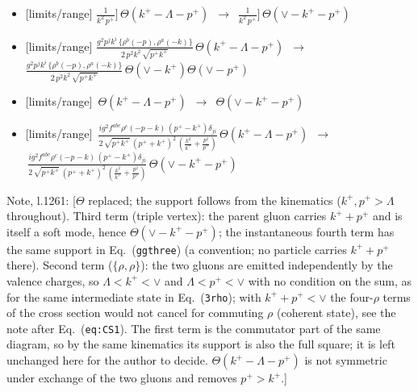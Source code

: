 \documentclass[10pt]{article}
\newenvironment{notebox}{\def\FrameCommand{{\color{notebar}\vrule width 1.5pt}\hspace{6pt}}\MakeFramed{\advance\hsize-\width\FrameRestore}\small}{\endMakeFramed}
\begin{document}
\begin{itemize}[leftmargin=2.2em,itemsep=1pt,topsep=2pt]
\item[\textbf{l.1260}] \textsf{\small [limits/range]} $\displaystyle \frac{1}{k^{2}\,p^{+}}]\,\Theta(k^{+}-\Lambda-p^{+})$\ $\longrightarrow$\ $\displaystyle \frac{1}{k^{2}\,p^{+}}]\,\Theta(\vee-k^{+}-p^{+})$
\item[\textbf{l.1260}] \textsf{\small [limits/range]} $\displaystyle \frac{g^{2}p^{j}k^{i}\,\{\rho^{b}(-p),\rho^{a}(-k)\}}{2\,p^{2}k^{2}\, \sqrt{p^{+}k^{+}}}\,\Theta(k^{+}-\Lambda-p^{+})$\ $\longrightarrow$\ $\displaystyle \frac{g^{2}p^{j}k^{i}\,\{\rho^{b}(-p),\rho^{a}(-k)\}}{2\,p^{2}k^{2}\, \sqrt{p^{+}k^{+}}}\,\Theta(\vee-k^{+})\Theta(\vee-p^{+})$
\item[\textbf{l.1260}] \textsf{\small [limits/range]} $\displaystyle \,\Theta(k^{+}-\Lambda-p^{+})$\ $\longrightarrow$\ $\displaystyle \Theta(\vee-k^{+}-p^{+})$
\item[\textbf{l.1260}] \textsf{\small [limits/range]} $\displaystyle \,\frac{ig^{2}f^{abc}\rho^{c}(-p-k)\,(p^{+}-k^{+})\delta_{ji}}{2\,\sqrt{p^{+}k^{+}}\,(p^{+}+k^{+})^{2}\,(\frac{k^{2}}{k^{+}}+\frac{p^{2}}{p^{+}})}\,\Theta(k^{+}-\Lambda-p^{+})$\ $\longrightarrow$\ $\displaystyle \,\frac{ig^{2}f^{abc}\rho^{c}(-p-k)\,(p^{+}-k^{+})\delta_{ji}}{2\,\sqrt{p^{+}k^{+}}\,(p^{+}+k^{+})^{2}\,(\frac{k^{2}}{k^{+}}+\frac{p^{2}}{p^{+}})}\,\Theta(\vee-k^{+}-p^{+})$
\end{itemize}
\begin{notebox}\textsf{\small Note, l.1261:} [$\Theta$ replaced; the support follows from the kinematics ($k^+,p^+>\Lambda$ throughout). Third term (triple vertex): the parent gluon carries $k^++p^+$ and is itself a soft mode, hence $\Theta(\vee-k^+-p^+)$; the instantaneous fourth term has the same support in Eq.~(\texttt{ggthree}) (a convention; no particle carries $k^++p^+$ there). Second term ($\{\rho,\rho\}$): the two gluons are emitted independently by the valence charges, so $\Lambda<k^+<\vee$ and $\Lambda<p^+<\vee$ with no condition on the sum, as for the same intermediate state in Eq.~(\texttt{3rho}); with $k^++p^+<\vee$ the four-$\rho$ terms of the cross section would not cancel for commuting $\rho$ (coherent state), see the note after Eq.~(\texttt{eq:CS1}). The first term is the commutator part of the same diagram, so by the same kinematics its support is also the full square; it is left unchanged here for the author to decide. $\Theta(k^+-\Lambda-p^+)$ is not symmetric under exchange of the two gluons and removes $p^+>k^+$.]\end{notebox}
\end{document}
